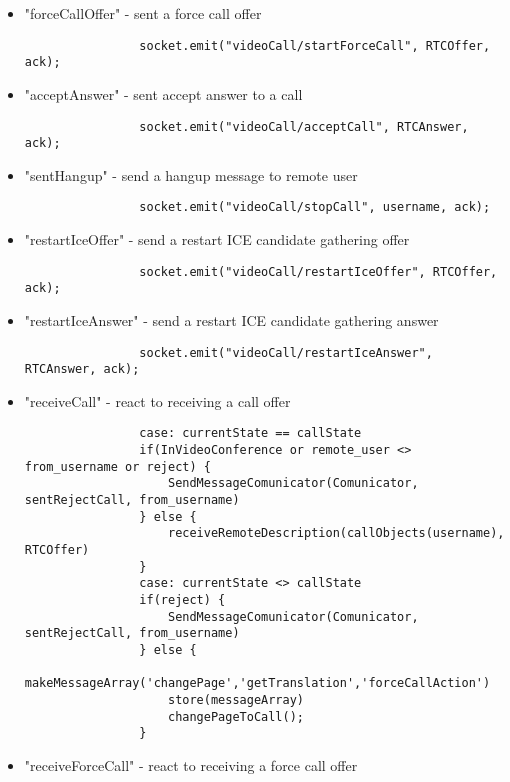 \begin{itemize}
            \item "forceCallOffer"  - sent a force call offer
            \begin{lstlisting}
                socket.emit("videoCall/startForceCall", RTCOffer, ack);
            \end{lstlisting}
            \item "acceptAnswer" - sent accept answer to a call
            \begin{lstlisting}
                socket.emit("videoCall/acceptCall", RTCAnswer, ack);
            \end{lstlisting}
            \item "sentHangup" - send a hangup message to remote user
            \begin{lstlisting}
                socket.emit("videoCall/stopCall", username, ack);
            \end{lstlisting}
            \item "restartIceOffer"  - send a restart ICE candidate gathering offer
            \begin{lstlisting}
                socket.emit("videoCall/restartIceOffer", RTCOffer, ack);
            \end{lstlisting}
            \item "restartIceAnswer" - send a restart ICE candidate gathering answer
            \begin{lstlisting}
                socket.emit("videoCall/restartIceAnswer", RTCAnswer, ack);
            \end{lstlisting}
            \item "receiveCall" - react to receiving a call offer
            \begin{lstlisting}
                case: currentState == callState
                if(InVideoConference or remote_user <> from_username or reject) {
                    SendMessageComunicator(Comunicator, sentRejectCall, from_username)
                } else {
                    receiveRemoteDescription(callObjects(username), RTCOffer)
                }
                case: currentState <> callState
                if(reject) {
                    SendMessageComunicator(Comunicator, sentRejectCall, from_username)
                } else {
                    makeMessageArray('changePage','getTranslation','forceCallAction')
                    store(messageArray)
                    changePageToCall();
                }
            \end{lstlisting}
            \item "receiveForceCall"  - react to receiving a force call offer

\end{itemize}
